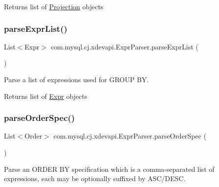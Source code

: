 \begin{DoxyReturn}{Returns}
list of \mbox{\hyperlink{}{Projection}} objects 
\end{DoxyReturn}
\mbox{\label{classcom_1_1mysql_1_1cj_1_1xdevapi_1_1_expr_parser_ae0e58b00609560b6a43556d12491d152}} 
\subsubsection{\texorpdfstring{parse\+Expr\+List()}{parseExprList()}}
{\footnotesize\ttfamily List$<$Expr$>$ com.\+mysql.\+cj.\+xdevapi.\+Expr\+Parser.\+parse\+Expr\+List (\begin{DoxyParamCaption}{ }\end{DoxyParamCaption})}

Parse a list of expressions used for G\+R\+O\+UP BY.

\begin{DoxyReturn}{Returns}
list of \mbox{\hyperlink{}{Expr}} objects 
\end{DoxyReturn}
\mbox{\label{classcom_1_1mysql_1_1cj_1_1xdevapi_1_1_expr_parser_aa948ecc19739c733f80c170943ce53fe}} 
\subsubsection{\texorpdfstring{parse\+Order\+Spec()}{parseOrderSpec()}}
{\footnotesize\ttfamily List$<$Order$>$ com.\+mysql.\+cj.\+xdevapi.\+Expr\+Parser.\+parse\+Order\+Spec (\begin{DoxyParamCaption}{ }\end{DoxyParamCaption})}

Parse an O\+R\+D\+ER BY specification which is a comma-\/separated list of expressions, each may be optionally suffixed by A\+S\+C/\+D\+E\+SC.

